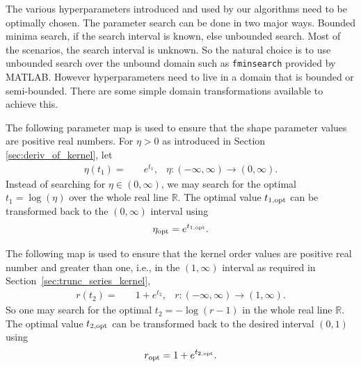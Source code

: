 \documentclass{iitthesis}          %
\newcommand{\reals}{\mathbb{R}}
\newcommand{\code}[1]{\texttt{#1}}
\newcommand\secref{Section~\ref}
\newcommand{\JRNote}[1]{}
\begin{document}
\label{sec:kernel_param_search}

\JRNote{Explain the transformation used to make the search range positive, $> 0$ , etc.}

The various hyperparameters introduced and used by our algorithms need to be optimally chosen. %
The parameter search can be done in two major ways. 
Bounded minima search, if the search interval is known, else unbounded search.  Most of the scenarios, the search interval is unknown. So the natural choice is to use unbounded search over the unbound domain such as \code{fminsearch} provided by MATLAB.
However hyperparameters need to live in a domain that is bounded or semi-bounded. 
There are some simple domain transformations available to achieve this.

The following parameter map is used to ensure that the shape parameter values are positive real numbers. For $\eta > 0$ as introduced in Section \ref{sec:deriv_of_kernel}, let
\begin{align*}
\eta{(t_1)} = & \quad e^{t_1}, & \eta : (-\infty, \infty) \to (0, \infty).
\end{align*}
Instead of searching for $\eta \in (0, \infty)$, we may search for the optimal $t_1 = \log(\eta)$ over the whole real line $\reals$. 
The optimal value $t_{1, \textup{opt}}$ can be transformed back to the $(0, \infty)$ interval using 
\begin{align*}
\eta_{\textup{opt}} = e^{t_{1,\textup{opt}}}.
\end{align*}



The following map is used to ensure that the kernel order values are positive real number and greater than one, i.e., in the $(1, \infty)$ interval as required in \secref{sec:trunc_series_kernel},
\begin{align*}
r(t_2) = & \quad {1 + e^{t_2}}, & r:  (-\infty, \infty) \to (1,\infty).
\end{align*}
So one may search for the optimal $t_2 = -\log(r-1)$ in the whole real line $\reals$.
The optimal value $t_{2, \textup{opt}}$ can be transformed back to the desired interval $(0,1)$ using 
\begin{align*}
r_{\textup{opt}} = 1+ e^{t_{2, \textup{opt}}}.
\end{align*}
\end{document}
